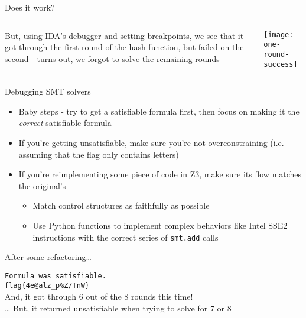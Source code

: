 \begin{frame}{Does it work?}
    \begin{columns}
        But, using IDA's debugger and setting breakpoints, we see that it
        got through the first round of the hash function, but failed on the
        second - turns out, we forgot to solve the remaining rounds

        \texttt{[image: one-round-success]}
    \end{columns}
\end{frame}

\begin{frame}{Debugging SMT solvers}
    \begin{itemize}
        \item<1-> Baby steps - try to get a satisfiable formula first, then
                  focus on making it the {\em correct} satisfiable formula
        \item<2-> If you're getting unsatisfiable, make sure you're not
                  overconstraining (i.e. assuming that the flag only contains
                  letters)
        \item<3-> If you're reimplementing some piece of code in Z3, make sure
                  its flow matches the original's
        \begin{itemize}
            \item<4-> Match control structures as faithfully as possible
            \item<5-> Use Python functions to implement complex behaviors like
                      Intel SSE2 instructions with the correct series of 
                      \texttt{smt.add} calls
        \end{itemize}
    \end{itemize}
\end{frame}

\begin{frame}{After some refactoring\ldots}
    \begin{center}
        {\Large
            \texttt{Formula was satisfiable.} \\
            \texttt{flag\{4e@alz\_p\%Z/TnW\}} \pause \\
            \vspace{0.5in}
            And, it got through 6 out of the 8 rounds this time! \pause \\
            \ldots\xspace But, it returned unsatisfiable when trying to solve
            for 7 or 8
        }
    \end{center}
\end{frame}

